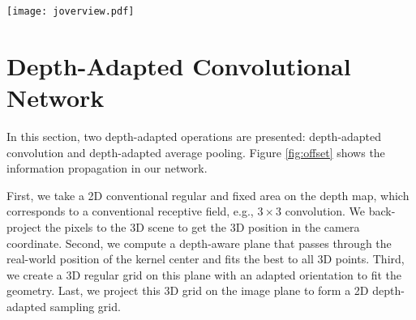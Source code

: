 \documentclass[lettersize,journal]{IEEEtran}
\begin{document}
\begin{figure*}[ht]
\centering
\texttt{[image: joverview.pdf]}
\caption{Illustration of depth-adapted CNN. On the left we show the example of a 3 $\times$ 3 kernel: a) shows a standard 2D convolution with dilation equal to 1. b) shows the offset computed from deformable convolution \cite{dai2017deformable}. c) is the available depth data. The represented figure shows a linear change with the depth value. From left to right, the scene becomes deeper.  d) illustrates offset computed by Z-ACN which is adapted to depth. On the right, we illustrate the overview of our approach. \textbf{LMS} stands for Least Mean Square algorithm.  $(\Vec{x'}, \Vec{y'})$ are the 3D unit axis. Firstly, pixels within the 2D receptive field are back-projected to 3D space to form a point cloud, based on which a 3D plane is computed with normal $\Vec{n}$ . Secondly, a new 3 $\times$ 3 grid on the 3D space is created with the help of 3D axis $(\Vec{x'}, \Vec{y'})$ which are perpendicular to the normal $\Vec{n}$. Finally, the 3D grid is projected to the image plane, forming our depth-adapted sampling position. Zoom in for more details on the depth-guided sampling position on the RGB image.}
\label{fig:offset}
\end{figure*}




\section{Depth-Adapted Convolutional Network}

In this section, two depth-adapted operations are presented: depth-adapted convolution and depth-adapted average pooling. Figure \ref{fig:offset} shows the information propagation in our network.

First, we take a 2D conventional regular and fixed area on the depth map, which corresponds to a conventional receptive field, e.g., $3 \times 3$ convolution. We back-project the pixels to the 3D scene to get the 3D position in the camera coordinate. Second, we compute a depth-aware plane that passes through the real-world position of the kernel center and fits the best to all 3D points. Third, we create a 3D regular grid on this plane with an adapted orientation to fit the geometry. Last, we project this 3D grid on the image plane to form a 2D depth-adapted sampling grid.
\end{document}
